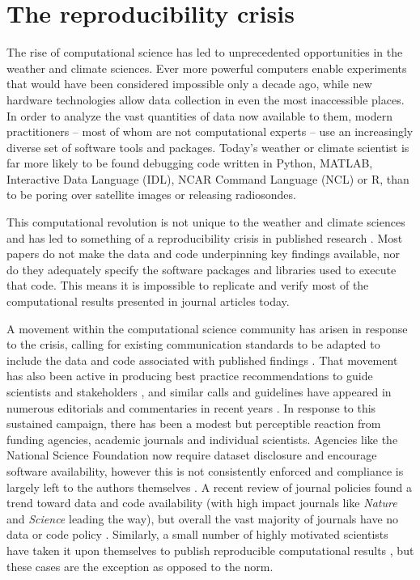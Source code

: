 \section{The reproducibility crisis}

The rise of computational science has led to unprecedented opportunities in the weather and climate sciences. Ever more powerful computers enable experiments that would have been considered impossible only a decade ago, while new hardware technologies allow data collection in even the most inaccessible places. In order to analyze the vast quantities of data now available to them, modern practitioners – most of whom are not computational experts – use an increasingly diverse set of software tools and packages. Today's weather or climate scientist is far more likely to be found debugging code written in Python, MATLAB, Interactive Data Language (IDL), NCAR Command Language (NCL) or R, than to be poring over satellite images or releasing radiosondes. 

This computational revolution is not unique to the weather and climate sciences and has led to something of a reproducibility crisis in published research \citep[e.g.][]{Peng2011}. Most papers do not make the data and code underpinning key findings available, nor do they adequately specify the software packages and libraries used to execute that code. This means it is impossible to replicate and verify most of the computational results presented in journal articles today.

A movement within the computational science community has arisen in response to the crisis, calling for existing communication standards to be adapted to include the data and code associated with published findings \citep[e.g.][]{Stodden2014}. That movement has also been active in producing best practice recommendations to guide scientists and stakeholders \citep[e.g.][]{Prlic2012,Sandve2013,Stodden2012a,Stodden2014}, and similar calls and guidelines have appeared in numerous editorials and commentaries in recent years \citep[e.g.][]{Barnes2010,Ince2012,Merali2010}. In response to this sustained campaign, there has been a modest but perceptible reaction from funding agencies, academic journals and individual scientists. Agencies like the National Science Foundation now require dataset disclosure and encourage software availability, however this is not consistently enforced and compliance is largely left to the authors themselves \citep{Stodden2013}. A recent review of journal policies found a trend toward data and code availability (with high impact journals like \textit{Nature} and \textit{Science} leading the way), but overall the vast majority of journals have no data or code policy \citep{Stodden2013}. Similarly, a small number of highly motivated scientists have taken it upon themselves to publish reproducible computational results \citep[e.g.][]{Crooks2014,Ketcheson2012,Schmitt2015}, but these cases are the exception as opposed to the norm.


